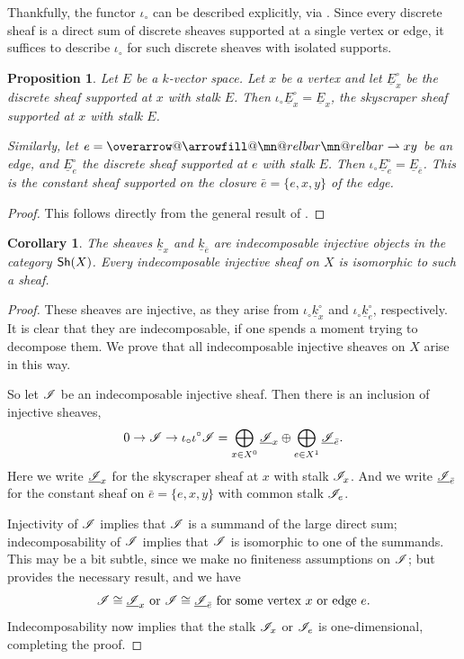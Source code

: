 \documentclass[letter]{amsart}
\makeatletter
\newtheorem{corollary}[thm]{Corollary}
\newtheorem{proposition}[thm]{Proposition}
\theoremstyle{definition}
\theoremstyle{remark}
\numberwithin{thm}{section}
\numberwithin{equation}{section}
\DeclareRobustCommand{\overrightharpoon}{\mathpalette{\overarrow@\rightharpoonfill@}}
\def\rightharpoonfill@{\arrowfill@\mn@relbar\mn@relbar\rightharpoonup}
\newcommand{\edge}[1]{\overrightharpoon{#1}}
\newcommand{\constsheaf}[1]{{\underline{#1}}}
\makeatother
\begin{document}
Thankfully, the functor $\iota_\circ$ can be described explicitly, via \cite[\href{https://stacks.math.columbia.edu/tag/00XF}{Tag 00XF}]{stacks-project}.  Since every discrete sheaf is a direct sum of discrete sheaves supported at a single vertex or edge, it suffices to describe $\iota_\circ$ for such discrete sheaves with isolated supports.
\begin{proposition}
Let $E$ be a $k$-vector space.  Let $x$ be a vertex and let $\constsheaf{E}_x^\circ$ be the discrete sheaf supported at $x$ with stalk $E$.  Then $\iota_\circ \constsheaf{E}_x^\circ = \constsheaf{E}_x$, the skyscraper sheaf supported at $x$ with stalk $E$.  

Similarly, let $e = \edge{xy}$ be an edge, and $\constsheaf{E}_e^\circ$ the discrete sheaf supported at $e$ with stalk $E$.  Then $\iota_\circ \constsheaf{E}_e^\circ = \constsheaf{E}_{\bar e}$.  This is the constant sheaf supported on the closure $\bar e = \{ e, x, y \}$ of the edge.
\end{proposition}
\begin{proof}
This follows directly from the general result of \cite[\href{https://stacks.math.columbia.edu/tag/01DJ}{Tag 01DJ}]{stacks-project}.
\end{proof}

\begin{corollary}
\label{indec-inj}
The sheaves $\constsheaf{k}_x$ and $\constsheaf{k}_{\bar e}$ are indecomposable injective objects in the category ${\mathsf{Sh}}(X)$.  Every indecomposable injective sheaf on $X$ is isomorphic to such a sheaf.
\end{corollary}
\begin{proof}
These sheaves are injective, as they arise from $\iota_\circ \constsheaf{k}_x^\circ$ and $\iota_\circ \constsheaf{k}_e^\circ$, respectively.  It is clear that they are indecomposable, if one spends a moment trying to decompose them.  We prove that all indecomposable injective sheaves on $X$ arise in this way.  

So let ${\mathscr{I}}$ be an indecomposable injective sheaf.  Then there is an inclusion of injective sheaves,
$$0 \To \sheaf{I} \To \iota_\circ \iota^\circ \sheaf{I} = \bigoplus_{x \in X^0}  \constsheaf{\sheaf{I}}_x \oplus \bigoplus_{e \in X^1} \constsheaf{\sheaf{I}}_{\bar e}.$$
Here we write $\constsheaf{\sheaf{I}}_x$ for the skyscraper sheaf at $x$ with stalk ${\mathscr{I}}_x$.  And we write $\constsheaf{\sheaf{I}}_{\bar e}$ for the constant sheaf on $\bar e = \{ e, x,y \}$ with common stalk ${\mathscr{I}}_e$.  

Injectivity of ${\mathscr{I}}$ implies that ${\mathscr{I}}$ is a summand of the large direct sum; indecomposability of ${\mathscr{I}}$ implies that ${\mathscr{I}}$ is isomorphic to one of the summands.  This may be a bit subtle, since we make no finiteness assumptions on ${\mathscr{I}}$; but \cite[Theorem 8]{LeeLee} provides the necessary result, and we have
$$\sheaf{I} \isom \constsheaf{\sheaf{I}}_x \text{ or } \sheaf{I} \isom \constsheaf{\sheaf{I}}_{\bar e} \text{ for some vertex } x \text{ or edge } e.$$
Indecomposability now implies that the stalk ${\mathscr{I}}_x$ or ${\mathscr{I}}_e$ is one-dimensional, completing the proof.
\end{proof}
\end{document}

